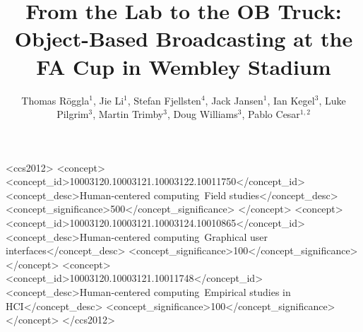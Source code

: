 \documentclass[sigchi-a]{acmart}
\begin{document}
\title{From the Lab to the OB Truck: Object-Based Broadcasting at the FA Cup in Wembley Stadium}

\author{Thomas R\"{o}ggla$^1$, Jie Li$^1$, Stefan Fjellsten$^4$, Jack Jansen$^1$,  Ian Kegel$^3$, Luke Pilgrim$^3$, Martin Trimby$^3$, Doug Williams$^3$, Pablo Cesar$^{1,2}$}


\renewcommand{\shortauthors}{T. R\"{o}ggla et al.}


%
%
\begin{CCSXML}
    <ccs2012>
        <concept>
            <concept_id>10003120.10003121.10003122.10011750</concept_id>
            <concept_desc>Human-centered computing~Field studies</concept_desc>
            <concept_significance>500</concept_significance>
        </concept>
        <concept>
            <concept_id>10003120.10003121.10003124.10010865</concept_id>
            <concept_desc>Human-centered computing~Graphical user interfaces</concept_desc>
            <concept_significance>100</concept_significance>
        </concept>
        <concept>
            <concept_id>10003120.10003121.10011748</concept_id>
            <concept_desc>Human-centered computing~Empirical studies in HCI</concept_desc>
            <concept_significance>100</concept_significance>
        </concept>
    </ccs2012>
\end{CCSXML}

\end{document}
